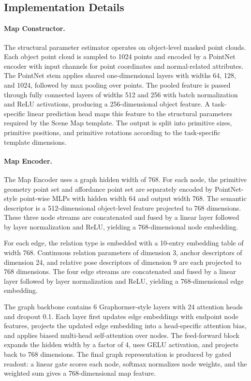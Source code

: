 \subsection{Implementation Details}
\label{app:implementation_details}

\paragraph{Map Constructor.}
The structural parameter estimator operates on object-level masked point clouds. Each object point cloud is sampled to 1024 points and encoded by a PointNet encoder with input channels for point coordinates and normal-related attributes. The PointNet stem applies shared one-dimensional layers with widths 64, 128, and 1024, followed by max pooling over points. The pooled feature is passed through fully connected layers of widths 512 and 256 with batch normalization and ReLU activations, producing a 256-dimensional object feature. A task-specific linear prediction head maps this feature to the structural parameters required by the Scene Map template. The output is split into primitive sizes, primitive positions, and primitive rotations according to the task-specific template dimensions.

\paragraph{Map Encoder.}
The Map Encoder uses a graph hidden width of 768. For each node, the primitive geometry point set and affordance point set are separately encoded by PointNet-style point-wise MLPs with hidden width 64 and output width 768. The semantic descriptor is a 512-dimensional object-level feature projected to 768 dimensions. These three node streams are concatenated and fused by a linear layer followed by layer normalization and ReLU, yielding a 768-dimensional node embedding.

For each edge, the relation type is embedded with a 10-entry embedding table of width 768. Continuous relation parameters of dimension 3, anchor descriptors of dimension 24, and relative pose descriptors of dimension 9 are each projected to 768 dimensions. The four edge streams are concatenated and fused by a linear layer followed by layer normalization and ReLU, yielding a 768-dimensional edge embedding.

The graph backbone contains 6 Graphormer-style layers with 24 attention heads and dropout 0.1. Each layer first updates edge embeddings with endpoint node features, projects the updated edge embedding into a head-specific attention bias, and applies biased multi-head self-attention over nodes. The feed-forward block expands the hidden width by a factor of 4, uses GELU activation, and projects back to 768 dimensions. The final graph representation is produced by gated readout: a linear gate scores each node, softmax normalizes node weights, and the weighted sum gives a 768-dimensional map feature.

